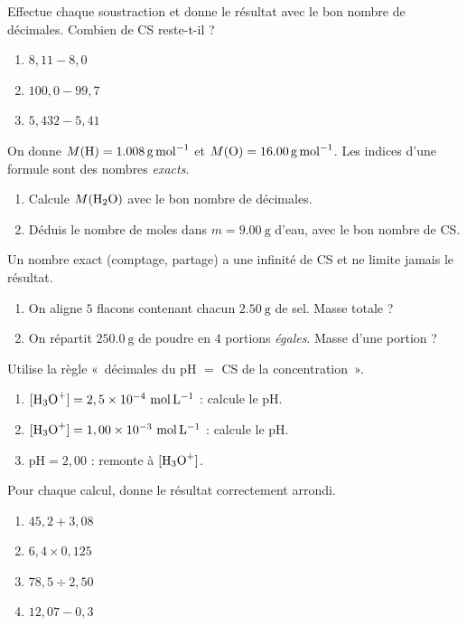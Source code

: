 \documentclass[11pt,a4paper]{article}
\begin{document}
\begin{exo}
Effectue chaque soustraction et donne le résultat avec le bon nombre de décimales. Combien de CS
reste-t-il ?
\begin{enumerate}[label=\alph*)]
  \item $8,11 - 8,0$
  \item $100,0 - 99,7$
  \item $5,432 - 5,41$
\end{enumerate}
\end{exo}

\begin{exo}
On donne $M(\ce{H})=\qty{1,008}{\gram\per\mole}$ et $M(\ce{O})=\qty{16,00}{\gram\per\mole}$. Les indices
d'une formule sont des nombres \emph{exacts}.
\begin{enumerate}[label=\alph*)]
  \item Calcule $M(\ce{H2O})$ avec le bon nombre de décimales.
  \item Déduis le nombre de moles dans $m=\qty{9,00}{\gram}$ d'eau, avec le bon nombre de CS.
\end{enumerate}
\end{exo}

\begin{exo}
Un nombre exact (comptage, partage) a une infinité de CS et ne limite jamais le résultat.
\begin{enumerate}[label=\alph*)]
  \item On aligne $5$ flacons contenant chacun $\qty{2,50}{\gram}$ de sel. Masse totale ?
  \item On répartit $\qty{250,0}{\gram}$ de poudre en $4$ portions \emph{égales}. Masse d'une portion ?
\end{enumerate}
\end{exo}

\begin{exo}
Utilise la règle «~décimales du pH $=$ CS de la concentration~».
\begin{enumerate}[label=\alph*)]
  \item $[\ce{H3O+}]=2,5\times10^{-4}\ \si{\mol\per\litre}$ : calcule le pH.
  \item $[\ce{H3O+}]=1,00\times10^{-3}\ \si{\mol\per\litre}$ : calcule le pH.
  \item $\mathrm{pH}=2,00$ : remonte à $[\ce{H3O+}]$.
\end{enumerate}
\end{exo}

\begin{exo}
Pour chaque calcul, donne le résultat correctement arrondi.
\begin{enumerate}[label=\alph*)]
  \item $45,2 + 3,08$
  \item $6,4 \times 0,125$
  \item $78,5 \div 2,50$
  \item $12,07 - 0,3$
\end{enumerate}
\end{exo}
\end{document}

